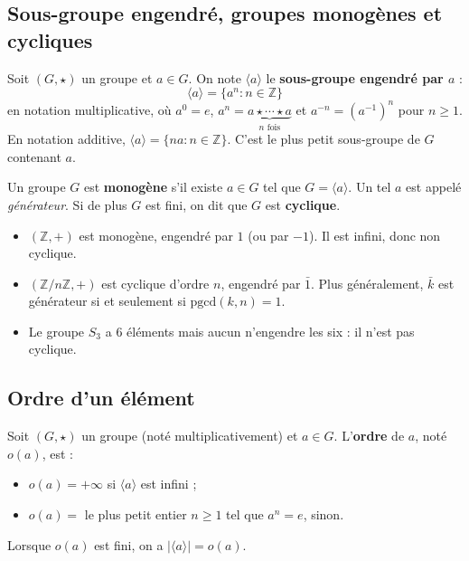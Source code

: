 \subsection{Sous-groupe engendré, groupes monogènes et cycliques}

\begin{definition}
Soit $(G, \star)$ un groupe et $a \in G$. On note $\langle a \rangle$ le \textbf{sous-groupe engendré par $a$} :
\[ \langle a \rangle = \{a^n : n \in \mathbb{Z}\} \]
en notation multiplicative, où $a^0 = e$, $a^n = \underbrace{a \star \cdots \star a}_{n \text{ fois}}$ et $a^{-n} = (a^{-1})^n$ pour $n \ge 1$. En notation additive, $\langle a \rangle = \{na : n \in \mathbb{Z}\}$. C'est le plus petit sous-groupe de $G$ contenant $a$.
\end{definition}

\begin{definition}
Un groupe $G$ est \textbf{monogène} s'il existe $a \in G$ tel que $G = \langle a \rangle$. Un tel $a$ est appelé \emph{générateur}. Si de plus $G$ est fini, on dit que $G$ est \textbf{cyclique}.
\end{definition}

\begin{exemple}
\begin{itemize}
    \item $(\mathbb{Z}, +)$ est monogène, engendré par $1$ (ou par $-1$). Il est infini, donc non cyclique.
    \item $(\mathbb{Z}/n\mathbb{Z}, +)$ est cyclique d'ordre $n$, engendré par $\bar{1}$. Plus généralement, $\bar{k}$ est générateur si et seulement si $\mathrm{pgcd}(k, n) = 1$.
    \item Le groupe $S_3$ a $6$ éléments mais aucun n'engendre les six : il n'est pas cyclique.
\end{itemize}
\end{exemple}

\subsection{Ordre d'un élément}

\begin{definition}
Soit $(G, \star)$ un groupe (noté multiplicativement) et $a \in G$. L'\textbf{ordre} de $a$, noté $o(a)$, est :
\begin{itemize}
    \item $o(a) = +\infty$ si $\langle a \rangle$ est infini ;
    \item $o(a) = $ le plus petit entier $n \ge 1$ tel que $a^n = e$, sinon.
\end{itemize}
Lorsque $o(a)$ est fini, on a $|\langle a \rangle| = o(a)$.
\end{definition}


